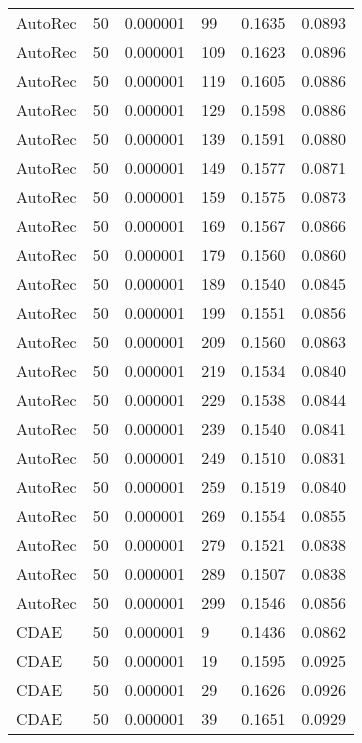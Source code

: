 \begin{tabular}{llrlrr}
 AutoRec &   50 &  0.000001 &    99 &  0.1635 &       0.0893 \\
 AutoRec &   50 &  0.000001 &   109 &  0.1623 &       0.0896 \\
 AutoRec &   50 &  0.000001 &   119 &  0.1605 &       0.0886 \\
 AutoRec &   50 &  0.000001 &   129 &  0.1598 &       0.0886 \\
 AutoRec &   50 &  0.000001 &   139 &  0.1591 &       0.0880 \\
 AutoRec &   50 &  0.000001 &   149 &  0.1577 &       0.0871 \\
 AutoRec &   50 &  0.000001 &   159 &  0.1575 &       0.0873 \\
 AutoRec &   50 &  0.000001 &   169 &  0.1567 &       0.0866 \\
 AutoRec &   50 &  0.000001 &   179 &  0.1560 &       0.0860 \\
 AutoRec &   50 &  0.000001 &   189 &  0.1540 &       0.0845 \\
 AutoRec &   50 &  0.000001 &   199 &  0.1551 &       0.0856 \\
 AutoRec &   50 &  0.000001 &   209 &  0.1560 &       0.0863 \\
 AutoRec &   50 &  0.000001 &   219 &  0.1534 &       0.0840 \\
 AutoRec &   50 &  0.000001 &   229 &  0.1538 &       0.0844 \\
 AutoRec &   50 &  0.000001 &   239 &  0.1540 &       0.0841 \\
 AutoRec &   50 &  0.000001 &   249 &  0.1510 &       0.0831 \\
 AutoRec &   50 &  0.000001 &   259 &  0.1519 &       0.0840 \\
 AutoRec &   50 &  0.000001 &   269 &  0.1554 &       0.0855 \\
 AutoRec &   50 &  0.000001 &   279 &  0.1521 &       0.0838 \\
 AutoRec &   50 &  0.000001 &   289 &  0.1507 &       0.0838 \\
 AutoRec &   50 &  0.000001 &   299 &  0.1546 &       0.0856 \\
    CDAE &   50 &  0.000001 &     9 &  0.1436 &       0.0862 \\
    CDAE &   50 &  0.000001 &    19 &  0.1595 &       0.0925 \\
    CDAE &   50 &  0.000001 &    29 &  0.1626 &       0.0926 \\
    CDAE &   50 &  0.000001 &    39 &  0.1651 &       0.0929 \\

\end{tabular}
